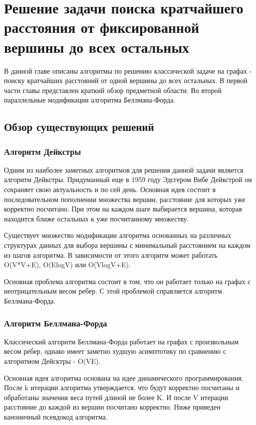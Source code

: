 \chapter{Решение задачи поиска кратчайшего расстояния от фиксированной вершины до всех остальных}
\label{chapSVD}

В данной главе описаны алгоритмы по решению классической задаче на графах - поиску кратчайших расстояний от одной вершины до всех остальных. В первой части главы представлен краткий обзор предметной области. Во второй параллельные модификации алгоритма Беллмана-Форда. 

\FloatBarrier
\section{Обзор существующих решений}
\subsection{Алгоритм Дейкстры}

Одним из наиболее заметных алгоритмов для решения данной задачи является алгоритм Дейкстры. Придуманный еще в 1959 году Эдсгером Вибе Дейкстрой он сохраняет свою актуальность и по сей день. Основная идея состоит в последовательном пополнении множества вершин, расстояние для которых уже корректно посчитано. При этом на каждом шаге выбирается вершина, которая находится ближе остальных к уже посчитанному множеству. 

Существует множество модификации алгоритма основанных на различных структурах данных для выбора вершины с минимальный расстоянием на каждом из шагов алгоритма. В зависимости от этого алгоритм может работать O(V*V+E), O(ElogV) или O(VlogV+E). 

Основная проблема алгоритма состоит в том, что он работает только на графах с неотрицательным весом ребер. С этой проблемой справляется алгоритм Беллмана-Форда. 


\FloatBarrier
\subsection{Алгоритм Беллмана-Форда}

Классический алгоритм Беллмана-Форда работает на графах с произвольным весом ребер, однако имеет заметно худшую асимптотику по сравнению с алгоритмом Дейсктры - O(VE). 

Основная идея алгоритма основана на идее динамического программирования. После k итерации алгоритма утверждается, что будут корректно посчитаны и обработаны значения веса путей длиной не более K. И после V итерации расстояние до каждой из вершин посчитано корректно. Ниже приведен каноничный псевдокод алгоритма. 

